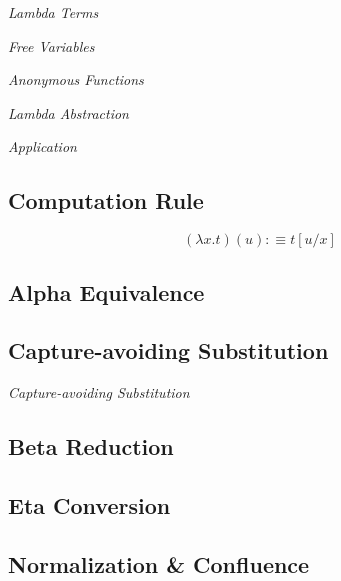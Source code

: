 \documentclass{article}
\begin{document}
\emph{Lambda Terms}

\emph{Free Variables}

\emph{Anonymous Functions}

\emph{Lambda Abstraction}

\emph{Application}

\subsection{Computation Rule}\label{subsec:computation_rule}

\[
    (\lambda x.t)(u) :\equiv t[u/x]
\]

\subsection{Alpha Equivalence}\label{subsec:alpha_equivalent}

\subsection{Capture-avoiding Substitution}\label{subsec:capture_avoiding}

\emph{Capture-avoiding Substitution}

\subsection{Beta Reduction}\label{subsec:beta_reduction}

\subsection{Eta Conversion}\label{subsec:eta_conversion}

\subsection{Normalization \& Confluence}\label{subsec:normalization_confluence}
\end{document}
